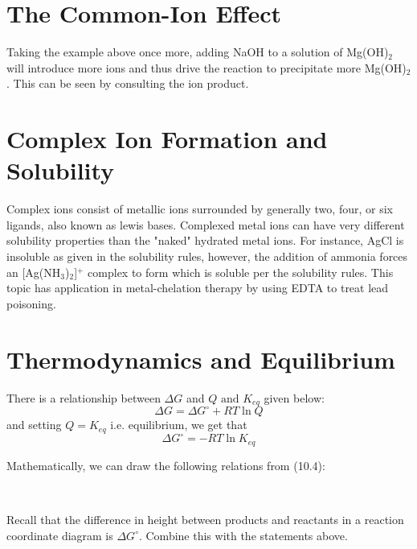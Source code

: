 \documentclass[../GChemReview.tex]{subfiles}
\begin{document}
		\section{The Common-Ion Effect}
		
		Taking the example above once more, adding NaOH to a solution of Mg(OH)$ _{2} $ will introduce more  ions and thus drive the reaction to precipitate more Mg(OH)$ _{2} $. This can be seen by consulting the ion product.
		
		\section{Complex Ion Formation and Solubility}
		
		Complex ions consist of metallic ions surrounded by generally two, four, or six ligands, also known as lewis bases. Complexed metal ions can have very different solubility properties than the "naked" hydrated metal ions. For instance, AgCl is insoluble as given in the solubility rules, however, the addition of ammonia forces an [Ag(NH$ _{3} $)$ _{2} $]$ ^{+} $ complex to form which is soluble per the solubility rules. This topic has application in metal-chelation therapy by using EDTA to treat lead poisoning.
		
		\section{Thermodynamics and Equilibrium}
		
		There is a relationship between $ \Delta G $ and $ Q \text{ and } K_{eq} $ given below:
		\begin{equation}
			\boxed{\Delta G = \Delta G^{\circ} + RT \ln Q}
		\end{equation}
		and setting $ Q = K_{eq} $ i.e. equilibrium, we get that
		\begin{equation}
			\boxed{\Delta G^{\circ} = -RT\ln K_{eq}}
		\end{equation}
		
		Mathematically, we can draw the following relations from (10.4):
		
		\centering
		\hfil \\
		
		\flushleft
		
		Recall that the difference in height between products and reactants in a reaction coordinate diagram is $ \Delta G^{\circ} $. Combine this with the statements above.
\end{document}
